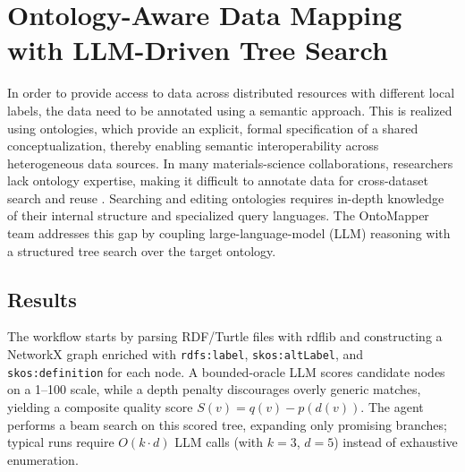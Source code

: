 


\section{Ontology-Aware Data Mapping with LLM-Driven Tree Search}

In order to provide access to data across distributed resources with different local labels, the data need to be annotated using a semantic approach. This is realized using ontologies, which provide an explicit, formal specification of a shared conceptualization, thereby enabling semantic interoperability across heterogeneous data sources. In many materials-science collaborations, researchers lack ontology expertise, making it difficult to annotate data for cross-dataset search and reuse \cite{Bayerlein2025, Schilling2025}. Searching and editing ontologies requires in-depth knowledge of their internal structure and specialized query languages. The OntoMapper team addresses this gap by coupling large-language-model (LLM) reasoning with a structured tree search over the target ontology.

\subsection*{Results}

The workflow starts by parsing RDF/Turtle files with rdflib and constructing a NetworkX graph enriched with \texttt{rdfs:label}, \texttt{skos:altLabel}, and \texttt{skos:definition} for each node.
A bounded-oracle LLM scores candidate nodes on a 1--100 scale, while a depth penalty discourages overly generic matches, yielding a composite quality score $S(v)=q(v)-p(d(v))$.
The agent performs a beam search on this scored tree, expanding only promising branches; typical runs require $O(k\cdot d)$ LLM calls (with $k = 3$, $d = 5$) instead of exhaustive enumeration.

